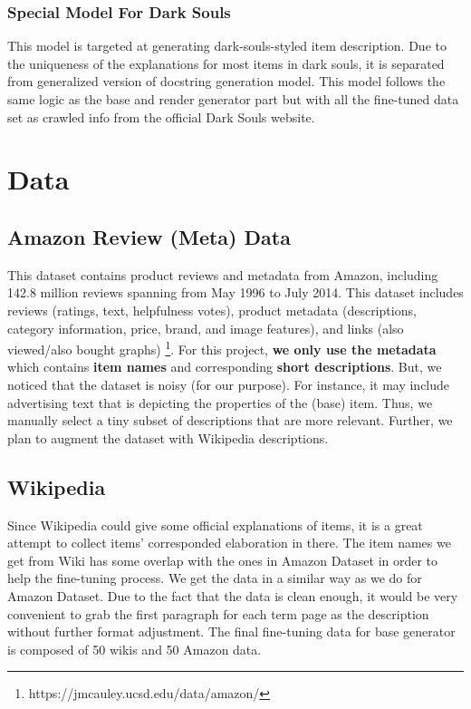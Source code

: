 \documentclass[11pt]{article}
\begin{document}
    \subsubsection{Special Model For Dark Souls}
    This model is targeted at generating dark-souls-styled item description. Due to the uniqueness of the explanations for most items in dark souls, it is separated from generalized version of docstring generation model. This model follows the same logic as the base and render generator part but with all the fine-tuned data set as crawled info from the official Dark Souls website.

\section{Data}
\label{section:data}
  \subsection{Amazon Review (Meta) Data} 
    This dataset contains product reviews and metadata from Amazon, including 142.8 million reviews 
      spanning from May 1996 to July 2014. This dataset includes reviews (ratings, text, helpfulness votes), 
      product metadata (descriptions, category information, price, brand, and image features), and 
      links (also viewed/also bought graphs) \footnote{https://jmcauley.ucsd.edu/data/amazon/}. For this project, \textbf{we only use the metadata} which 
      contains \textbf{item names} and corresponding \textbf{short descriptions}. But, we noticed that 
      the dataset is noisy (for our purpose). For instance, it may include advertising 
      text that is depicting the properties of the (base) item. Thus, we manually select a tiny subset of 
      descriptions that are more relevant. Further, we plan to augment the dataset with Wikipedia descriptions.

  \subsection{Wikipedia}
  Since Wikipedia could give some official explanations of items, it is a great attempt to collect items' corresponded elaboration in there. The item names we get from Wiki has some overlap with the ones in Amazon Dataset in order to help the fine-tuning process. We get the data in a similar way as we do for Amazon Dataset. Due to the fact that the data is clean enough, it would be very convenient to grab the first paragraph for each term page as the description without further format adjustment. The final fine-tuning data for base generator is composed of 50 wikis and 50 Amazon data.
\end{document}
